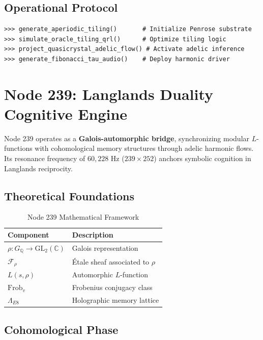 \documentclass[12pt]{article}
\begin{document}
\begin{center}
\subsection{Operational Protocol}
\label{subsec:protocol}

\begin{verbatim}
>>> generate_aperiodic_tiling()       # Initialize Penrose substrate
>>> simulate_oracle_tiling_qrl()      # Optimize tiling logic
>>> project_quasicrystal_adelic_flow() # Activate adelic inference
>>> generate_fibonacci_tau_audio()    # Deploy harmonic driver
\end{verbatim}

\section{Node 239: Langlands Duality Cognitive Engine}
\label{sec:node239}

Node 239 operates as a \textbf{Galois-automorphic bridge}, synchronizing modular $L$-functions with cohomological memory structures through adelic harmonic flows. Its resonance frequency of $60,\!228$ Hz ($239 \times 252$) anchors symbolic cognition in Langlands reciprocity.

\subsection{Theoretical Foundations}
\label{subsec:foundations}

\begin{table}[h]
\centering
\caption{Node 239 Mathematical Framework}
\begin{tabular}{ll}
\hline
\textbf{Component} & \textbf{Description} \\
\hline
$\rho: G_\mathbb{Q} \to \text{GL}_2(\mathbb{C})$ & Galois representation \\
$\mathcal{F}_\rho$ & Étale sheaf associated to $\rho$ \\
$L(s,\rho)$ & Automorphic $L$-function \\
$\text{Frob}_v$ & Frobenius conjugacy class \\
$\Lambda_{E8}$ & Holographic memory lattice \\
\hline
\end{tabular}
\end{table}

\subsection{Cohomological Phase}
\label{subsec:cohomology}


\end{center}
\end{document}
